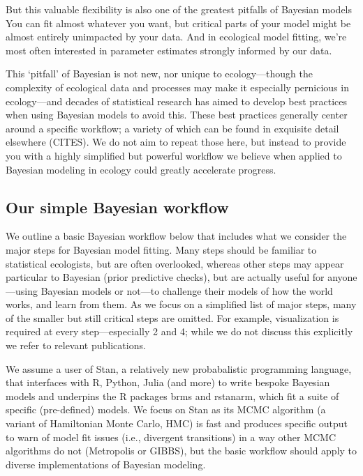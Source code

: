 \documentclass[11pt]{article}
\begin{document}
But this valuable flexibility is also one of the greatest pitfalls of Bayesian models You can fit almost whatever you want, but critical parts of your model might be almost entirely unimpacted by your data. And in ecological model fitting, we're most often interested in parameter estimates strongly informed by our data. 

This `pitfall' of Bayesian is not new, nor unique to ecology---though the complexity of ecological data and processes may make it especially pernicious in ecology---and decades of statistical research has aimed to develop best practices when using Bayesian models to avoid this. These best practices generally center around a specific workflow; a variety of which can be found in exquisite detail elsewhere (CITES). We do not aim to repeat those here, but instead to provide you with a highly simplified but powerful workflow we believe when applied to Bayesian modeling in ecology could greatly accelerate progress. %

\subsection{Our simple Bayesian workflow}

We outline a basic Bayesian workflow below that includes what we consider the major steps for Bayesian model fitting. Many steps should be familiar to statistical ecologists, but are often overlooked, whereas other steps may appear particular to Bayesian (\eg prior predictive checks), but are actually useful for anyone---using Bayesian models or not---to challenge their models of how the world works, and learn from them. As we focus on a simplified list of major steps, many of the smaller but still critical steps are omitted. For example, visualization is required at every step---especially 2 and 4; while we do not discuss this explicitly we refer to relevant publications.

We assume a user of \textsf{Stan}, a relatively new probabalistic programming language, that interfaces with \textsf{R, Python, Julia} (and more) to write bespoke Bayesian models and underpins the \textsf{R} packages \textsf{brms} and \textsf{rstanarm}, which fit a suite of specific (pre-defined) models. We focus on \textsf{Stan} as its MCMC algorithm (a variant of Hamiltonian Monte Carlo, HMC) is fast and produces specific output to warn of model fit issues (i.e., divergent transitions) in a way other MCMC algorithms do not (\eg Metropolis or GIBBS), but the basic workflow should apply to diverse implementations of Bayesian modeling. \\
\end{document}
